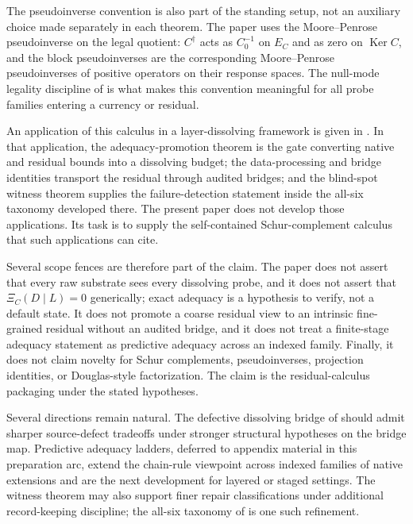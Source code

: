 \documentclass[11pt]{article}
\DeclareMathOperator{\Ker}{Ker}
\theoremstyle{definition}
\begin{document}
The pseudoinverse convention is also part of the standing setup, not an
auxiliary choice made separately in each theorem.  The paper uses the
Moore--Penrose pseudoinverse on the legal quotient: \(C^\dagger\) acts as
\(C_0^{-1}\) on \(E_C\) and as zero on \(\Ker C\), and the block pseudoinverses
are the corresponding Moore--Penrose pseudoinverses of positive operators on
their response spaces.  The null-mode legality discipline of 
is what makes this convention meaningful for all probe families entering a
currency or residual.

An application of this calculus in a layer-dissolving framework is given in
\citet{Tsiokos2026NeedleKiller}.  In that application, the adequacy-promotion
theorem is the gate converting native and residual bounds into a dissolving
budget; the data-processing and bridge identities transport the residual
through audited bridges; and the blind-spot witness theorem supplies the
failure-detection statement inside the all-six taxonomy developed there.  The
present paper does not develop those applications.  Its task is to supply the
self-contained Schur-complement calculus that such applications can cite.

Several scope fences are therefore part of the claim.  The paper does not
assert that every raw substrate sees every dissolving probe, and it does not
assert that \(\Xi_C(D\mid L)=0\) generically; exact adequacy is a hypothesis to
verify, not a default state.  It does not promote a coarse residual view to an
intrinsic fine-grained residual without an audited bridge, and it does not
treat a finite-stage adequacy statement as predictive adequacy across an
indexed family.  Finally, it does not claim novelty for Schur complements,
pseudoinverses, projection identities, or Douglas-style factorization.  The
claim is the residual-calculus packaging under the stated hypotheses.

Several directions remain natural.  The defective dissolving bridge of
 should admit sharper source-defect tradeoffs
under stronger structural hypotheses on the bridge map.  Predictive adequacy
ladders, deferred to appendix material in this preparation arc, extend the
chain-rule viewpoint across indexed families of native extensions and are the
next development for layered or staged settings.  The witness theorem may also
support finer repair classifications under additional record-keeping
discipline; the all-six taxonomy of \citet{Tsiokos2026NeedleKiller} is one
such refinement.
 
\end{document}
